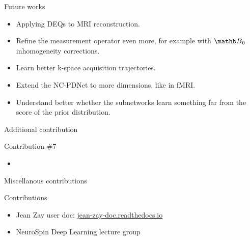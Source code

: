 \documentclass[aspectratio=169,xcolor=dvipsnames]{beamer}
\begin{document}
\begin{frame}{Future works}
    \begin{itemize}
        \item Applying DEQs to MRI reconstruction.
        \item Refine the measurement operator even more, for example with $\Bb_0$ inhomogeneity corrections.
        \item Learn better k-space acquisition trajectories.
        \item Extend the NC-PDNet to more dimensions, like in fMRI.
        \item Understand better whether the subnetworks learn something far from the score of the prior distribution.
    \end{itemize}
\end{frame}

\begin{frame}{Additional contribution}
    \begin{exampleblock}{Contribution \#7}
        \begin{itemize}
            \item {}
        \end{itemize}
    \end{exampleblock}
\end{frame}

\begin{frame}{Miscellanous contributions}
    \begin{exampleblock}{Contributions}
        \begin{itemize}
            \item Jean Zay user doc: \href{https://jean-zay-doc.readthedocs.io/}{jean-zay-doc.readthedocs.io}
            \item NeuroSpin Deep Learning lecture group
        \end{itemize}
    \end{exampleblock}
\end{frame}
\end{document}
